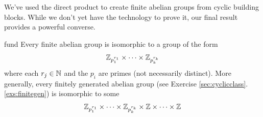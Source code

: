 
We've used the direct product to create finite abelian groups from cyclic building blocks. While we don't yet have the technology to prove it, our final result provides a powerful converse.

\begin{thm}{}{fund}
	Every finite abelian group is isomorphic to a group of the form
	\[
		\mathbb{Z}_{p_1^{r_1}}\times\cdots\times\mathbb{Z}_{p_k^{r_k}}
	\]
	where each $r_j\in\mathbb{N}$ and the $p_i$ are primes (not necessarily distinct). More generally, every finitely generated abelian group (see Exercise \ref*{sec:cyclicclass}.\ref{exs:finitegen}) is isomorphic to some
	\[
		\mathbb{Z}_{p_1^{r_1}}\times\cdots\times\mathbb{Z}_{p_k^{r_k}}\times\mathbb{Z}\times\cdots\times\mathbb{Z}
	\]
\end{thm}




\goodbreak


